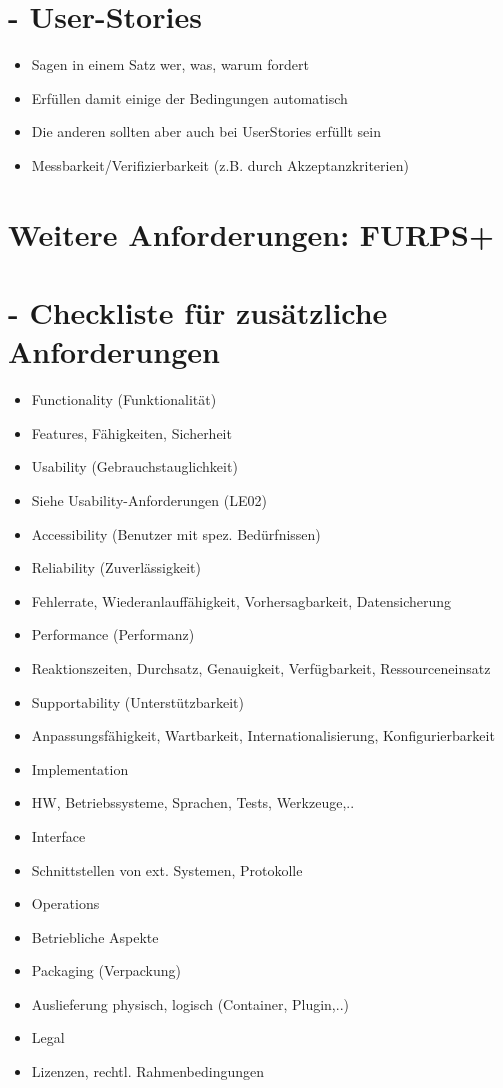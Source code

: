 \documentclass[10pt]{article}
\begin{document}
\section*{- User-Stories}
\begin{itemize}
  \item Sagen in einem Satz wer, was, warum fordert
  \item Erfüllen damit einige der Bedingungen automatisch
  \item Die anderen sollten aber auch bei UserStories erfüllt sein
  \item Messbarkeit/Verifizierbarkeit (z.B. durch Akzeptanzkriterien)
\end{itemize}

\section*{Weitere Anforderungen: FURPS+}
\section*{- Checkliste für zusätzliche Anforderungen}
\begin{itemize}
  \item Functionality (Funktionalität)
  \item Features, Fähigkeiten, Sicherheit
  \item Usability (Gebrauchstauglichkeit)
  \item Siehe Usability-Anforderungen (LE02)
  \item Accessibility (Benutzer mit spez. Bedürfnissen)
  \item Reliability (Zuverlässigkeit)
  \item Fehlerrate, Wiederanlauffähigkeit, Vorhersagbarkeit, Datensicherung
  \item Performance (Performanz)
  \item Reaktionszeiten, Durchsatz, Genauigkeit, Verfügbarkeit, Ressourceneinsatz
  \item Supportability (Unterstützbarkeit)
  \item Anpassungsfähigkeit, Wartbarkeit, Internationalisierung, Konfigurierbarkeit
  \item Implementation
  \item HW, Betriebssysteme, Sprachen, Tests, Werkzeuge,..
  \item Interface
  \item Schnittstellen von ext. Systemen, Protokolle
  \item Operations
  \item Betriebliche Aspekte
  \item Packaging (Verpackung)
  \item Auslieferung physisch, logisch (Container, Plugin,..)
  \item Legal
  \item Lizenzen, rechtl. Rahmenbedingungen
\end{itemize}
\end{document}
